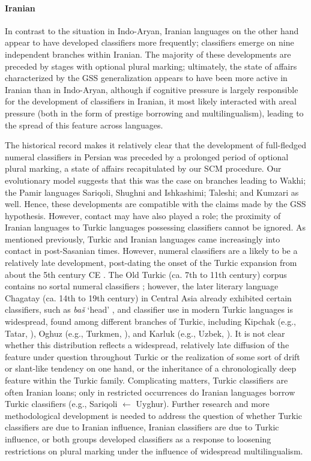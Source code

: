 \documentclass[11pt]{article}
\begin{document}
\paragraph{Iranian}
In contrast to the situation in Indo-Aryan, 
Iranian languages on the other hand appear to have developed classifiers more frequently; classifiers emerge on nine independent branches within Iranian. 
The majority of these developments are preceded by stages with optional plural marking; ultimately, the state of affairs characterized by the GSS generalization appears to have been more active in Iranian than in Indo-Aryan, although if cognitive pressure is largely responsible for the development of classifiers in Iranian, it most likely interacted with areal pressure (both in the form of prestige borrowing and multilingualism), leading to the spread of this feature across languages. 

The historical record makes it relatively clear that the development of full-fledged numeral classifiers in Persian was preceded by a prolonged period of optional plural marking, a state of affairs recapitulated by our SCM procedure. Our evolutionary model suggests that this was the case on branches leading to Wakhi; the Pamir languages Sariqoli, Shughni and Ishkashimi; Taleshi; and Kumzari as well. Hence, these developments are compatible with the claims made by the GSS hypothesis. However, contact may have also played a role; the proximity of Iranian languages to Turkic languages possessing classifiers cannot be ignored. 
As mentioned previously, Turkic and Iranian languages came increasingly into contact in post-Sasanian times. 
However, numeral classifiers are a likely to be a relatively late development, post-dating the onset of the Turkic expansion from about the 5th century CE \citep{Yunusbayev2015}. The Old Turkic (ca. 7th to 11th century) corpus contains no sortal numeral classifiers \citep[226]{Erdal2004}; however, the later literary language Chagatay (ca. 14th to 19th century) in Central Asia already exhibited certain classifiers, such as {\it ba\v{s}} `head' \citep[155]{Bodrogligeti2001}, and classifier use in modern Turkic languages is widespread, found among different branches of Turkic, including Kipchak (e.g., Tatar, \citealt[70]{ChenZongzhenYiLiqian1986}), Oghuz (e.g., Turkmen, \citealt[169]{Clark1998}), and Karluk (e.g., Uzbek, \citealt{Beckwith1998}). 
It is not clear whether this distribution reflects a widespread, relatively late diffusion of the feature under question throughout Turkic or the realization of some sort of drift or slant-like tendency on one hand, or the inheritance of a chronologically deep feature within the Turkic family. 
Complicating matters, Turkic classifiers are often Iranian loans; only in restricted occurrences do Iranian languages borrow Turkic classifiers (e.g., Sariqoli $\leftarrow$ Uyghur). 
Further research and more methodological development is needed to address the question of whether Turkic classifiers are due to Iranian influence, Iranian classifiers are due to Turkic influence, or both groups developed classifiers as a response to loosening restrictions on plural marking under the influence of widespread multilingualism. 
\end{document}
